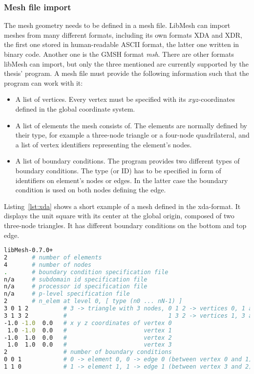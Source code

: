   \subsubsection{Mesh file import}\label{sec:Impl-Details-MeshFileImport}
   The mesh geometry needs to be defined in a mesh file. LibMesh can import meshes from many different formats, including its own formats XDA and XDR, the first one stored in human-readable ASCII format, the latter one written in binary code. Another one is the GMSH format \textit{msh}. There are other formats libMesh can import, but only the three mentioned are currently supported by the thesis' program. A mesh file must provide the following information such that the program can work with it:
   \begin{itemize}
   	\item A list of vertices. Every vertex must be specified with its $xyz$-coordinates defined in the global coordinate system.
   	\item A list of elements the mesh consists of. The elements are normally defined by their type, for example a three-node triangle or a four-node quadrilateral, and a list of vertex identifiers representing the element's nodes.
   	\item A list of boundary conditions. The program provides two different types of boundary conditions. The type (or ID) has to be specified in form of identifiers on element's nodes or edges. In the latter case the boundary condition is used on both nodes defining the edge.
   \end{itemize}
   Listing~\ref{lst:xda} shows a short example of a mesh defined in the xda-format. It displays the unit square with its center at the global origin, composed of two three-node triangles. It has different boundary conditions on the bottom and top edge.
\begin{lstlisting}[caption=Example xda mesh file,label=lst:xda,language=bash,keepspaces=true]
libMesh-0.7.0+
2       # number of elements
4       # number of nodes
.       # boundary condition specification file
n/a     # subdomain id specification file
n/a     # processor id specification file
n/a     # p-level specification file
2       # n_elem at level 0, [ type (n0 ... nN-1) ]
3 0 1 2          # 3 -> triangle with 3 nodes, 0 1 2 -> vertices 0, 1 and 2
3 1 3 2          #                             1 3 2 -> vertices 1, 3 and 2
-1.0 -1.0  0.0   # x y z coordinates of vertex 0
 1.0 -1.0  0.0   #                      vertex 1
-1.0  1.0  0.0   #                      vertex 2
 1.0  1.0  0.0   #                      vertex 3
2                # number of boundary conditions
0 0 1            # 0 -> element 0, 0 -> edge 0 (between vertex 0 and 1), bc-type 1
1 1 0            # 1 -> element 1, 1 -> edge 1 (between vertex 3 and 2), bc-type 0
\end{lstlisting}
